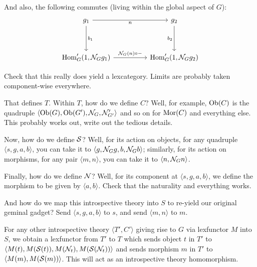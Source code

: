 \documentclass[./main.tex]{subfiles}
\begin{document}
\begin{TODOblock}
And also, the following commutes (living within the global aspect of $G$): %
\[\begin{tikzcd}
	{g_1} && {g_2} \\
	\\
	{\Hom_G'(1, \introN_G g_1)} && {\Hom_G'(1, \introN_G g_2)}
	\arrow["{b_1}", from=1-1, to=3-1]
	\arrow["n"', from=1-1, to=1-3]
	\arrow["{b_2}"', from=1-3, to=3-3]
	\arrow["{\introN_G(n) \circ -}", from=3-1, to=3-3]
\end{tikzcd}\]

Check that this really does yield a lexcategory. Limits are probably taken component-wise everywhere.

That defines $T$. Within $T$, how do we define $C$? Well, for example, $\operatorname{Ob}(C)$ is the quadruple $\langle \operatorname{Ob}(G), \operatorname{Ob}(G'), \mathcal{N}_G, \mathcal{N}'_{G'} \rangle$ and so on for $\operatorname{Mor}(C)$ and everything else. This probably works out, write out the tedious details.

Now, how do we define $\mathcal{S}$? Well, for its action on objects, for any quadruple $\langle s, g, a, b \rangle$, you can take it to $\langle g, \mathcal{N}_G g, b, \mathcal{N}_G b\rangle$; similarly, for its action on morphisms, for any pair $\langle m, n\rangle$, you can take it to $\langle n, \mathcal{N}_G n \rangle$.

Finally, how do we define $\mathcal{N}$? Well, for its component at $\langle s, g, a, b \rangle$, we define the morphism to be given by $\langle a, b \rangle$. Check that the naturality and everything works.

And how do we map this introspective theory into $S$ to re-yield our original geminal gadget? Send $\langle s, g, a, b \rangle$ to $s$, and send $\langle m, n \rangle$ to $m$.

For any other introspective theory $\langle T', C' \rangle$ giving rise to $G$ via lexfunctor $M$ into $S$, we obtain a lexfunctor from $T'$ to $T$ which sends object $t$ in $T'$ to $\langle M(t), M(\mathcal{S}(t)), M(\mathcal{N}_t), M(\mathcal{S}(\mathcal{N}_t))\rangle$ and sends morphism $m$ in $T'$ to $\langle M(m), M(\mathcal{S}(m))\rangle$. This will act as an introspective theory homomorphism.
\end{TODOblock}
\end{document}
